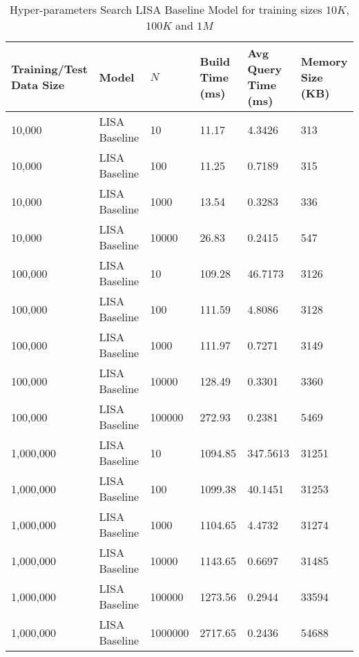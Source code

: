 \begin{table}
	\centering
	\begin{tabular}{||p{}<{\centering}|p{}<{\centering}| p{}<{\centering}|p{}<{\centering}|p{}<{\centering}|p{}<{\centering}||}
		\hline
		Training/Test Data Size& Model & $N$ & Build Time (ms) & Avg Query Time (ms) & Memory Size (KB)\\ [0.5ex] 
		\hline
		\hline
		10,000& LISA Baseline & 10 & 11.17 & 4.3426 & 313\\
		\hline
		10,000& LISA Baseline & 100 & 11.25 & 0.7189 & 315\\
		\hline
		10,000& LISA Baseline & 1000 & 13.54 & 0.3283 & 336\\
		\hline
		10,000& LISA Baseline & 10000 &26.83 & 0.2415 & 547\\
		\hline
		100,000& LISA Baseline & 10 & 109.28 & 46.7173 & 3126\\
		\hline
		100,000& LISA Baseline & 100 & 111.59& 4.8086 & 3128\\
		\hline
		100,000& LISA Baseline & 1000 & 111.97 & 0.7271 & 3149\\
		\hline
		100,000& LISA Baseline & 10000 & 128.49 & 0.3301 & 3360\\
		\hline
		100,000& LISA Baseline & 100000 & 272.93 & 0.2381 & 5469\\
		\hline
		1,000,000& LISA Baseline & 10 & 1094.85 & 347.5613 & 31251\\
		\hline
		1,000,000& LISA Baseline & 100 & 1099.38 & 40.1451 & 31253\\
		\hline
		1,000,000& LISA Baseline & 1000 & 1104.65 & 4.4732 & 31274\\
		\hline
		1,000,000& LISA Baseline & 10000 & 1143.65 & 0.6697 & 31485\\
		\hline
		1,000,000& LISA Baseline & 100000 & 1273.56 &  0.2944 &33594 \\
		\hline
		1,000,000& LISA Baseline & 1000000 & 2717.65 & 0.2436 & 54688\\
		\hline
		\hline
	\end{tabular}
    \caption{Hyper-parameters Search LISA Baseline Model for training sizes $10K$, $100K$ and $1M$ \\
    }
    \label{small_lognormal_lisa_baseline_10000}
\end{table}

